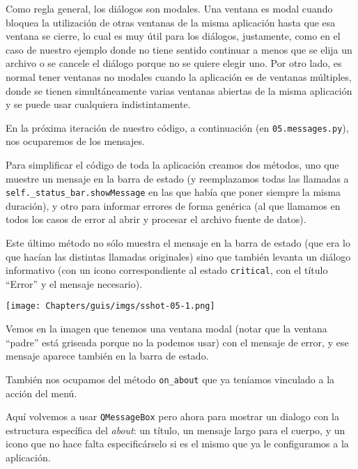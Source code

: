 Como regla general, los diálogos son modales. Una ventana es modal cuando bloquea la utilización de otras ventanas de la misma aplicación hasta que esa ventana se cierre, lo cual es muy útil para los diálogos, justamente, como en el caso de nuestro ejemplo donde no tiene sentido continuar a menos que se elija un archivo o se cancele el diálogo porque no se quiere elegir uno. Por otro lado, es normal tener ventanas no modales cuando la aplicación es de ventanas múltiples, donde se tienen simultáneamente varias ventanas abiertas de la misma aplicación y se puede usar cualquiera indistintamente.

En la próxima iteración de nuestro código, a continuación (en \texttt{05.messages.py}), nos ocuparemos de los mensajes.

Para simplificar el código de toda la aplicación creamos dos métodos, uno que muestre un mensaje en la barra de estado (y reemplazamos todas las llamadas a \texttt{self.\_status\_bar.showMessage} en las que había que poner siempre la misma duración), y otro para informar errores de forma genérica (al que llamamos en todos los casos de error al abrir y procesar el archivo fuente de datos).


Este último método no sólo muestra el mensaje en la barra de estado (que era lo que hacían las distintas llamadas originales) sino que también levanta un diálogo informativo (con un icono correspondiente al estado \texttt{critical}, con el título ``Error'' y el mensaje necesario).

\begin{center}
    \texttt{[image: Chapters/guis/imgs/sshot-05-1.png]}
\end{center}

Vemos en la imagen que tenemos una ventana modal (notar que la ventana ``padre'' está griseada porque no la podemos usar) con el mensaje de error, y ese mensaje aparece también en la barra de estado.

También nos ocupamos del método \texttt{on\_about} que ya teníamos vinculado a la acción del menú.


Aquí volvemos a usar \texttt{QMessageBox} pero ahora para mostrar un dialogo con la estructura específica del \textit{about}: un título, un mensaje largo para el cuerpo, y un icono que no hace falta especificárselo si es el mismo que ya le configuramos a la aplicación.

